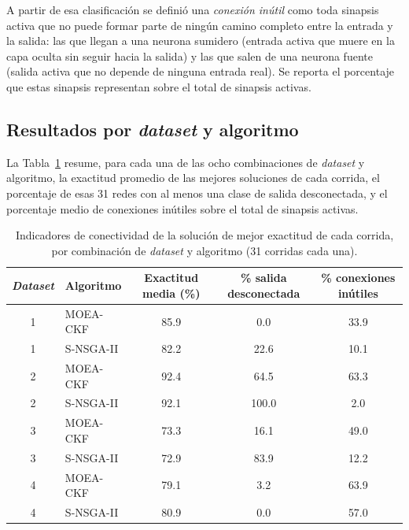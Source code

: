 A partir de esa clasificación se definió una \emph{conexión inútil} como toda sinapsis activa que no puede formar parte de ningún camino completo entre la entrada y la salida: las que llegan a una neurona sumidero (entrada activa que muere en la capa oculta sin seguir hacia la salida) y las que salen de una neurona fuente (salida activa que no depende de ninguna entrada real). Se reporta el porcentaje que estas sinapsis representan sobre el total de sinapsis activas.

\subsection{Resultados por \textit{dataset} y algoritmo}
\label{sec:conectividad-resultados-combo}

La Tabla~\ref{tab:conectividad-combo} resume, para cada una de las ocho combinaciones de \textit{dataset} y algoritmo, la exactitud promedio de las mejores soluciones de cada corrida, el porcentaje de esas 31 redes con al menos una clase de salida desconectada, y el porcentaje medio de conexiones inútiles sobre el total de sinapsis activas.

\begin{table}[htbp]
\centering
\small
\caption{Indicadores de conectividad de la solución de mejor exactitud de cada corrida, por combinación de \textit{dataset} y algoritmo (31 corridas cada una).}
\label{tab:conectividad-combo}
\begin{tabular}{clccc}
\toprule
\textbf{\textit{Dataset}} & \textbf{Algoritmo} & \textbf{Exactitud media} (\%) & \% \textbf{salida desconectada} & \% \textbf{conexiones inútiles} \\
\midrule
1 & MOEA-CKF & 85.9 & 0.0   & 33.9 \\
1 & S-NSGA-II & 82.2 & 22.6   & 10.1 \\
2    & MOEA-CKF & 92.4 & 64.5  & 63.3 \\
2    & S-NSGA-II & 92.1 & 100.0 & 2.0  \\
3     & MOEA-CKF & 73.3 & 16.1  & 49.0 \\
3     & S-NSGA-II & 72.9 & 83.9   & 12.2 \\
4      & MOEA-CKF & 79.1 & 3.2   & 63.9 \\
4      & S-NSGA-II & 80.9 & 0.0   & 57.0 \\
\bottomrule
\end{tabular}
\end{table}

